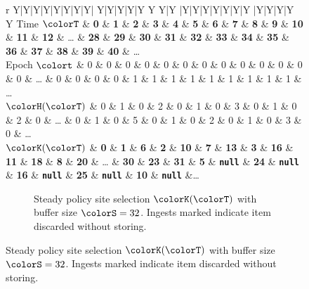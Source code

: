 \begin{figure}[htbp!]
  \centering

\begin{minipage}{\textwidth}
  \scriptsize
  \setlength{\tabcolsep}{2.5pt}
  \begin{tabularx}{\textwidth}{
    r
    Y|Y|Y|Y|Y|Y|Y|Y|
    Y|Y|Y|Y|Y Y Y|Y
    |Y|Y|Y|Y|Y|Y|Y
    |Y|Y|Y|Y Y
    }
     { Time $\colorT$} & \textbf{0} & \textbf{1} & \textbf{2} & \textbf{3} & \textbf{4} & \textbf{5} & \textbf{6} & \textbf{7}
    & \textbf{8} & \textbf{9} & \textbf{10} & \textbf{11} & \textbf{12} %
    &  \ldots
    & \textbf{28} & \textbf{29} & \textbf{30} & \textbf{31}
    & \textbf{32} & \textbf{33} & \textbf{34} & \textbf{35}
    & \textbf{36} & \textbf{37} & \textbf{38} & \textbf{39} & \textbf{40}
    & \ldots \\ \hline
   { Epoch $\colort$} & 0 & 0 & 0 & 0 & 0 & 0 & 0 & 0
    & 0 & 0 & 0 & 0 & 0 %
    &  \ldots
    & 0 & 0 & 0 & 0
    & 1 & 1 & 1 & 1
    & 1 & 1 & 1 & 1 & 1
    & \ldots \\
    { \scriptsize$\colorH(\colorT)$} & 0 & 1 & 0 & 2 & 0 & 1 & 0 & 3
    & 0 & 1 & 0 & 2 & 0 %
    &  \ldots
    & 0 & 1 & 0 & 5
    & 0 & 1 & 0 & 2
    & 0 & 1 & 0 & 3 & 0
    & \ldots \\
    \hline
     { \scriptsize $\colorK(\colorT)$} & \textbf{0} & \textbf{1} & \textbf{6} & \textbf{2} & \textbf{10} & \textbf{7} & \textbf{13} & \textbf{3}
     & \textbf{16} & \textbf{11} & \textbf{18} & \textbf{8} & \textbf{20} & \ldots
 & \textbf{30} & \textbf{23} & \textbf{31} & \textbf{5} & {\tiny \texttt{\textbf{null\hphantom{}}}}  %
 & \textbf{24} & {\tiny \texttt{\textbf{null\hphantom{}}}} & \textbf{16}
 & {\tiny \texttt{\textbf{null\hphantom{}}}} & \textbf{25} & {\tiny \texttt{\textbf{null\hphantom{}}}} & \textbf{10} & {\tiny \texttt{\textbf{null\hphantom{}}}}  &\ldots
  \end{tabularx}
  \vspace{-2ex}
\end{minipage}
\begin{subfigure}{\textwidth}
\caption{\footnotesize Steady policy site selection $\colorK(\colorT)$ with buffer size $\colorS=32$. Ingests marked \nullval{} indicate item discarded without storing.}
\label{fig:hsurf-steady-implementation-site-selection}
\end{subfigure}
\vspace{-3ex}


\end{figure}
